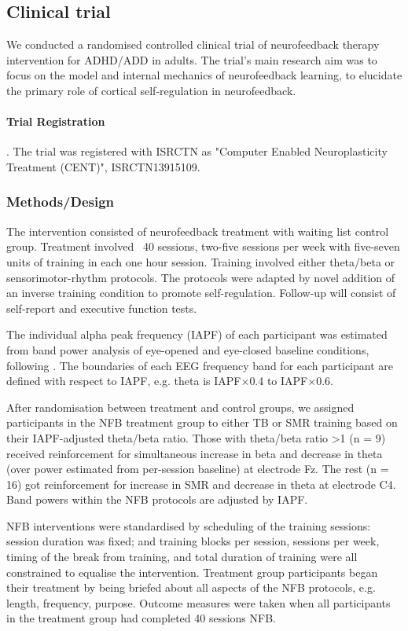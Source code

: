 \subsection{Clinical trial}

We conducted a randomised controlled clinical trial of neurofeedback therapy intervention for ADHD/ADD in adults. The trial's main research aim was to focus on the model and internal mechanics of neurofeedback learning, to elucidate the primary role of cortical self-regulation in neurofeedback.

\paragraph{Trial Registration}. The trial was registered with ISRCTN as "Computer Enabled Neuroplasticity Treatment (CENT)", ISRCTN13915109.


\subsubsection{Methods/Design}
The intervention consisted of neurofeedback treatment with waiting list control group. Treatment involved ~40 sessions, two-five sessions per week with five-seven units of training in each one hour session. Training involved either theta/beta or sensorimotor-rhythm protocols. The protocols were adapted by novel addition of an inverse training condition to promote self-regulation. Follow-up will consist of self-report and executive function tests.

The individual alpha peak frequency (IAPF) of each participant was estimated from band power analysis of eye-opened and eye-closed baseline conditions, following \cite{Lansbergen2011}. The boundaries of each EEG frequency band for each participant are defined with respect to IAPF, e.g. theta is IAPF$\times$0.4 to IAPF$\times$0.6.

After randomisation between treatment and control groups, we assigned participants in the NFB treatment group to either TB or SMR training based on their IAPF-adjusted theta/beta ratio. Those with theta/beta ratio \textgreater 1 (n = 9) received reinforcement for simultaneous increase in beta and decrease in theta (over power estimated from per-session baseline) at electrode Fz. The rest (n = 16) got reinforcement for increase in SMR and decrease in theta at electrode C4. Band powers within the NFB protocols are adjusted by IAPF. 

NFB interventions were standardised by scheduling of the training sessions: session duration was fixed; and training blocks per session, sessions per week, timing of the break from training, and total duration of training were all constrained to equalise the intervention. Treatment group participants began their treatment by being briefed about all aspects of the NFB protocols, e.g. length, frequency, purpose. Outcome measures were taken when all participants in the treatment group had completed 40 sessions NFB.



